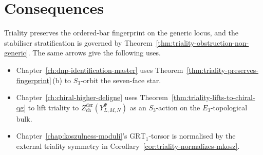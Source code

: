 \section{Consequences}
\label{sec:triality-summary}

Triality preserves the ordered-bar fingerprint on the generic locus,
and the stabiliser stratification is governed by
Theorem~\ref{thm:triality-obstruction-non-generic}. The same arrows
give the following uses.
\begin{itemize}
\item Chapter~\ref{ch:dnp-identification-master} uses
 Theorem~\ref{thm:triality-preserves-fingerprint}\,(b) to
 $S_3$-orbit the seven-face star.
\item Chapter~\ref{ch:chiral-higher-deligne} uses
 Theorem~\ref{thm:triality-lifts-to-chiral-qg} to lift triality
 to $Z^{\mathrm{der}}_{\mathrm{ch}}(Y_{L,M,N}^\Psi)$ as an
 $S_3$-action on the $E_3$-topological bulk.
\item Chapter~\ref{chap:koszulness-moduli}'s
 $\mathrm{GRT}_1$-torsor is normalised by the external triality
 symmetry in Corollary~\ref{cor:triality-normalizes-mkosz}.
\end{itemize}
